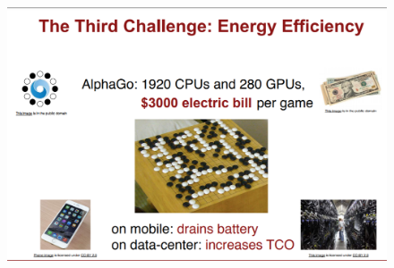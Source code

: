 \documentclass[11pt]{article}
\makeatletter
\def\maxwidth{\ifdim\Gin@nat@width>\linewidth\linewidth
    \else\Gin@nat@width\fi}
\let\Oldincludegraphics\includegraphics
\renewcommand{\includegraphics}[1]{\Oldincludegraphics[width=.8\maxwidth]{#1}}
\makeatother
\begin{document}
    \begin{figure}
\centering
\includegraphics{ml_problem3.png}
\caption{}
\end{figure}


    
    
    
    
\end{document}
